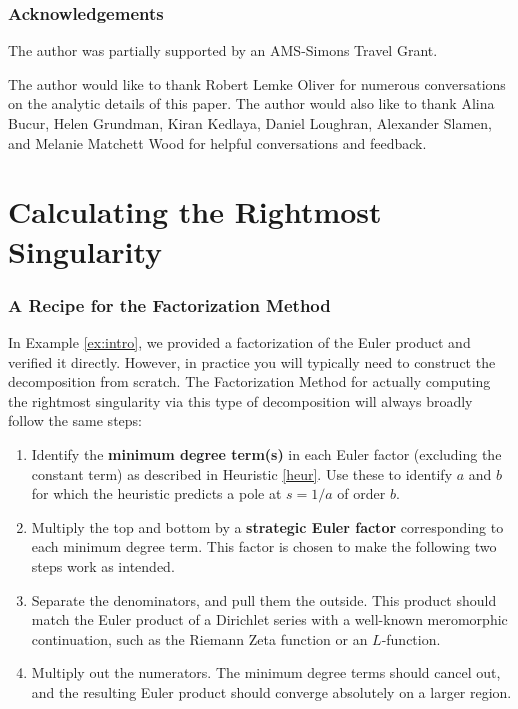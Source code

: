 \documentclass[12pt]{amsart}
\theoremstyle{plain}
\begin{document}
\section*{Acknowledgements}
The author was partially supported by an AMS-Simons Travel Grant.

The author would like to thank Robert Lemke Oliver for numerous conversations on the analytic details of this paper. The author would also like to thank Alina Bucur, Helen Grundman, Kiran Kedlaya, Daniel Loughran, Alexander Slamen, and Melanie Matchett Wood for helpful conversations and feedback.








\part{Calculating the Rightmost Singularity}\label{part:calculations}


\section{A Recipe for the Factorization Method}

In Example \ref{ex:intro}, we provided a factorization of the Euler product and verified it directly. However, in practice you will typically need to construct the decomposition from scratch. The Factorization Method for actually computing the rightmost singularity via this type of decomposition will always broadly follow the same steps:
\begin{enumerate}[(1)]
\item Identify the \textbf{minimum degree term(s)} in each Euler factor (excluding the constant term) as described in Heuristic \ref{heur}. Use these to identify $a$ and $b$ for which the heuristic predicts a pole at $s=1/a$ of order $b$.

\item Multiply the top and bottom by a \textbf{strategic Euler factor} corresponding to each minimum degree term. This factor is chosen to make the following two steps work as intended.

\item Separate the denominators, and pull them the outside. This product should match the Euler product of a Dirichlet series with a well-known meromorphic continuation, such as the Riemann Zeta function or an $L$-function.

\item Multiply out the numerators. The minimum degree terms should cancel out, and the resulting Euler product should converge absolutely on a larger region.
\end{enumerate}
\end{document}
